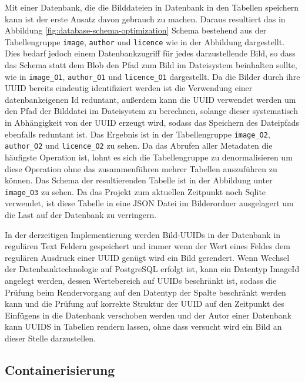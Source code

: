Mit einer Datenbank, die die Bilddateien in Datenbank in den Tabellen speichern
kann ist der erste Ansatz davon gebrauch zu machen. Daraus resultiert das in
Abbildung \ref{fig:database-schema-optimization} Schema
bestehend aus der Tabellengruppe \texttt{image}, \texttt{author} und
\texttt{licence} wie in der Abbildung dargestellt. Dies bedarf jedoch einem
Datenbankzugriff für jedes darzustellende Bild, so dass das Schema statt dem
Blob den Pfad zum Bild im Dateisystem beinhalten sollte, wie in
\texttt{image\_O1}, \texttt{author\_O1} und \texttt{licence\_O1} dargestellt. Da
die Bilder durch ihre UUID bereits eindeutig identifiziert werden ist die
Verwendung einer datenbankeigenen Id reduntant, außerdem kann die UUID verwendet
werden um den Pfad der Bilddatei im Dateisystem zu berechnen, solange dieser
systematisch in Abhängigkeit von der UUID erzeugt wird, sodass das Speichern des
Dateipfads ebenfalls reduntant ist. Das Ergebnis ist in der Tabellengruppe
\texttt{image\_O2}, \texttt{author\_O2} und \texttt{licence\_O2} zu sehen. Da
das Abrufen aller Metadaten die häufigste Operation ist, lohnt es sich die
Tabellengruppe zu denormalisieren um diese Operation ohne das zusammenführen
mehrer Tabellen auszuführen zu können. Das Schema der resultierenden Tabelle ist
in der Abbildung unter \texttt{image\_O3} zu sehen. Da das Projekt zum aktuellen
Zeitpunkt noch Sqlite verwendet, ist diese Tabelle in eine JSON Datei im
Bilderordner ausgelagert um die Last auf der Datenbank zu verringern.

In der derzeitigen Implementierung werden Bild-UUIDs in der Datenbank in
regulären Text Feldern gespeichert und immer wenn der Wert eines Feldes dem
regulären Ausdruck einer UUID genügt wird ein Bild gerendert. Wenn Wechsel der
Datenbanktechnologie auf PostgreSQL erfolgt ist, kann ein Datentyp ImageId
angelegt werden, dessen Wertebereich auf UUIDs beschränkt ist, sodass die
Prüfung beim Rendervorgang auf den Datentyp der Spalte beschränkt werden kann
und die Prüfung auf korrekte Struktur der UUID auf den Zeitpunkt des Einfügens
in die Datenbank verschoben werden und der Autor einer Datenbank kann UUIDS in
Tabellen rendern lassen, ohne dass versucht wird ein Bild an dieser Stelle
darzustellen.

\subsection{Containerisierung}
\label{subsec:4-containerization}

